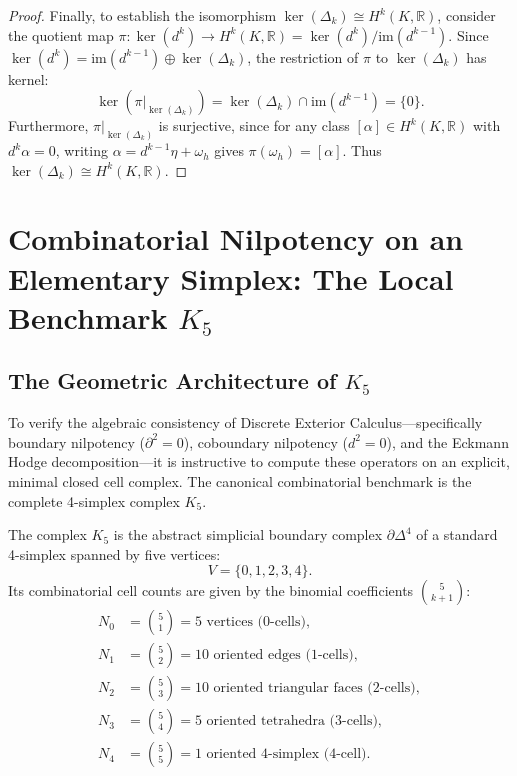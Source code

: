 \begin{proof}
Finally, to establish the isomorphism $\ker(\Delta_k) \cong H^k(K, \mathbb{R})$, consider the quotient map $\pi: \ker(d^k) \to H^k(K, \mathbb{R}) = \ker(d^k) / \mathrm{im}(d^{k-1})$. Since $\ker(d^k) = \mathrm{im}(d^{k-1}) \oplus \ker(\Delta_k)$, the restriction of $\pi$ to $\ker(\Delta_k)$ has kernel:
\begin{equation}
\ker(\pi|_{\ker(\Delta_k)}) = \ker(\Delta_k) \cap \mathrm{im}(d^{k-1}) = \{0\}.
\end{equation}
Furthermore, $\pi|_{\ker(\Delta_k)}$ is surjective, since for any class $[\alpha] \in H^k(K, \mathbb{R})$ with $d^k \alpha = 0$, writing $\alpha = d^{k-1} \eta + \omega_h$ gives $\pi(\omega_h) = [\alpha]$. Thus $\ker(\Delta_k) \cong H^k(K, \mathbb{R})$.
\end{proof}

\section{Combinatorial Nilpotency on an Elementary Simplex: The Local Benchmark $K_5$}
\label{sec:k5_simplicial_hodge}

\subsection{The Geometric Architecture of $K_5$}
\label{subsec:k5_geometry}

To verify the algebraic consistency of Discrete Exterior Calculus—specifically boundary nilpotency ($\partial^2 = 0$), coboundary nilpotency ($d^2 = 0$), and the Eckmann Hodge decomposition—it is instructive to compute these operators on an explicit, minimal closed cell complex. The canonical combinatorial benchmark is the complete 4-simplex complex $K_5$.

The complex $K_5$ is the abstract simplicial boundary complex $\partial \Delta^4$ of a standard 4-simplex spanned by five vertices:
\begin{equation}
V = \{0, 1, 2, 3, 4\}.
\end{equation}
Its combinatorial cell counts are given by the binomial coefficients $\binom{5}{k+1}$:
\begin{align}
N_0 &= \binom{5}{1} = 5 \text{ vertices (0-cells)}, \\
N_1 &= \binom{5}{2} = 10 \text{ oriented edges (1-cells)}, \\
N_2 &= \binom{5}{3} = 10 \text{ oriented triangular faces (2-cells)}, \\
N_3 &= \binom{5}{4} = 5 \text{ oriented tetrahedra (3-cells)}, \\
N_4 &= \binom{5}{5} = 1 \text{ oriented 4-simplex (4-cell)}.
\end{align}

